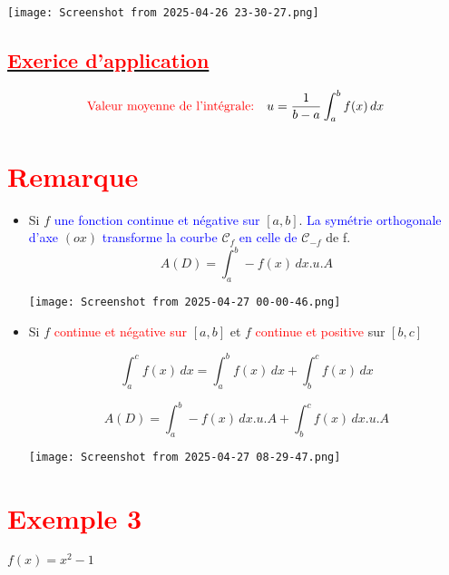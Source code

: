 \documentclass[12pt]{article}
\begin{document}
\begin{center}
   \texttt{[image: Screenshot from 2025-04-26 23-30-27.png]}
\end{center}

\subsection*{\underline{\textbf{\textcolor{red}{Exerice d'application}}}}

\[
\textcolor{red}{\text{Valeur moyenne de l'intégrale:}} \quad u = \frac{1}{b-a} \int_a^b f(x) \, dx
\]

\section*{\textbf{\textcolor{red}{Remarque}}}

\begin{itemize}
\item Si \( f \) \textcolor{blue}{une fonction continue et négative sur} \([a,b]\). \textcolor{blue}{La symétrie orthogonale d'axe} \( (ox) \) \textcolor{blue}{transforme la courbe} \(\mathcal{C}_f\) \textcolor{blue}{en celle de} \( \mathcal{C}_{-f} \) de f.
\[
A(D)=\int_a^b -f(x) \, dx .u.A 
\]
\begin{center}
   \texttt{[image: Screenshot from 2025-04-27 00-00-46.png]}
\end{center}
\item Si  \( f \) \textcolor{red}{continue et négative sur } \([a,b]\) et \( f \) \textcolor{red}{continue et positive} sur \([b,c]\)

\[
\int_a^c f(x) \, dx = \int_a^b f(x) \, dx + \int_b^c f(x) \, dx
\]

\[
A(D) = \int_a^b -f(x) \, dx.u.A + \int_b^c f(x) \, dx.u.A
\]

\begin{center}
   \texttt{[image: Screenshot from 2025-04-27 08-29-47.png]}
\end{center} 
\end{itemize}  

\section*{\textbf{\textcolor{red}{Exemple 3}}}

$f(x)=x^{2}-1$

\end{document}
